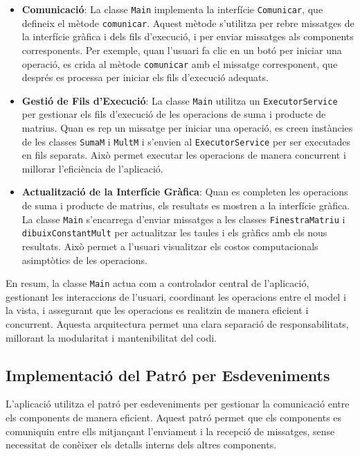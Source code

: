 \documentclass{ieeetj}
\begin{document}
\begin{itemize}
\begin{itemize}
    \item \textbf{Comunicació}: La classe \texttt{Main} implementa la interfície \texttt{Comunicar}, que defineix el mètode \texttt{comunicar}. Aquest mètode s'utilitza per rebre missatges de la interfície gràfica i dels fils d'execució, i per enviar missatges als components corresponents. Per exemple, quan l'usuari fa clic en un botó per iniciar una operació, es crida al mètode \texttt{comunicar} amb el missatge corresponent, que després es processa per iniciar els fils d'execució adequats.
    
    \item \textbf{Gestió de Fils d'Execució}: La classe \texttt{Main} utilitza un \texttt{ExecutorService} per gestionar els fils d'execució de les operacions de suma i producte de matrius. Quan es rep un missatge per iniciar una operació, es creen instàncies de les classes \texttt{SumaM} i \texttt{MultM} i s'envien al \texttt{ExecutorService} per ser executades en fils separats. Això permet executar les operacions de manera concurrent i millorar l'eficiència de l'aplicació.
    
    \item \textbf{Actualització de la Interfície Gràfica}: Quan es completen les operacions de suma i producte de matrius, els resultats es mostren a la interfície gràfica. La classe \texttt{Main} s'encarrega d'enviar missatges a les classes \texttt{FinestraMatriu} i \texttt{dibuixConstantMult} per actualitzar les taules i els gràfics amb els nous resultats. Això permet a l'usuari visualitzar els costos computacionals asimptòtics de les operacions.
\end{itemize}

En resum, la classe \texttt{Main} actua com a controlador central de l'aplicació, gestionant les interaccions de l'usuari, coordinant les operacions entre el model i la vista, i assegurant que les operacions es realitzin de manera eficient i concurrent. Aquesta arquitectura permet una clara separació de responsabilitats, millorant la modularitat i mantenibilitat del codi.
\end{itemize}

\subsection{Implementació del Patró per Esdeveniments}
L'aplicació utilitza el patró per esdeveniments per gestionar la comunicació entre els components de manera eficient. Aquest patró permet que els components es comuniquin entre ells mitjançant l'enviament i la recepció de missatges, sense necessitat de conèixer els detalls interns dels altres components.
\end{document}

